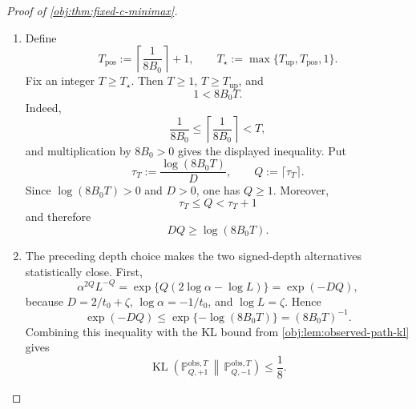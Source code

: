 \begin{proof}[Proof of \cref{obj:thm:fixed-c-minimax}]
\begin{enumerate}
\item Define
\[
T_{\mathrm{pos}}:=\left\lceil\frac{1}{8B_0}\right\rceil+1,
\qquad
T_\star:=\max\{T_{\mathrm{up}},T_{\mathrm{pos}},1\}.
\]
Fix an integer \(T\ge T_\star\). Then \(T\ge1\), \(T\ge T_{\mathrm{up}}\), and
\[
1<8B_0T .
\]
Indeed,
\[
\frac{1}{8B_0}
\le
\left\lceil\frac{1}{8B_0}\right\rceil
<
T,
\]
and multiplication by \(8B_0>0\) gives the displayed inequality. Put
\[
\tau_T:=\frac{\log(8B_0T)}{D},
\qquad
Q:=\lceil \tau_T\rceil .
\]
Since \(\log(8B_0T)>0\) and \(D>0\), one has \(Q\ge1\). Moreover,
\[
\tau_T\le Q<\tau_T+1
\]
and therefore
\[
DQ\ge \log(8B_0T).
\] %

\item The preceding depth choice makes the two signed-depth alternatives statistically close. First,
\[
\alpha^{2Q}L^{-Q}
=
\exp\{Q(2\log\alpha-\log L)\}
=
\exp(-DQ),
\]
because \(D=2/t_0+\zeta\), \(\log\alpha=-1/t_0\), and \(\log L=\zeta\). Hence
\[
\exp(-DQ)
\le
\exp\{-\log(8B_0T)\}
=
(8B_0T)^{-1}.
\]
Combining this inequality with the KL bound from \cref{obj:lem:observed-path-kl} gives
\[
\operatorname{KL}\!\left(
\mathbb P_{Q,+1}^{\mathrm{obs},T}
\,\middle\|\,
\mathbb P_{Q,-1}^{\mathrm{obs},T}
\right)
\le
\frac18 .
\] %


\end{enumerate}
\end{proof}
